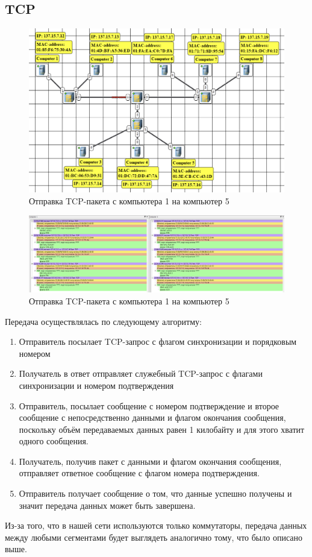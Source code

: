 \documentclass[12pt,onecolumn]{article}
\begin{document}
\subsection{TCP}
\begin{figure}[H]
  \centering
  \includegraphics[width=\textwidth]{image/part3/tcp.png}
  \caption{Отправка TCP-пакета с компьютера 1 на компьютер 5}
\end{figure}
\begin{figure}[H]
  \centering
  \includegraphics[width=\textwidth]{image/part3/tcp-1.png}
  \caption{Отправка TCP-пакета с компьютера 1 на компьютер 5}
\end{figure}

Передача осуществлялась по следующему алгоритму:
\begin{enumerate}
  \item Отправитель посылает TCP-запрос с флагом синхронизации и порядковым номером
  \item Получатель в ответ отправляет служебный TCP-запрос с флагами синхронизации и номером подтверждения
  \item Отправитель, посылает сообщение с номером подтверждение и второе сообщение с непосредственно данными и флагом окончания сообщения, поскольку объём передаваемых данных равен 1 килобайту и для этого хватит одного сообщения.
  \item Получатель, получив пакет с данными и флагом окончания сообщения, отправляет ответное сообщение с флагом номера подтверждения.
  \item Отправитель получает сообщение о том, что данные успешно получены и значит передача данных может быть завершена.
\end{enumerate}
Из-за того, что в нашей сети используются только коммутаторы, передача данных между любыми сегментами будет выглядеть аналогично тому, что было описано выше.
\end{document}
